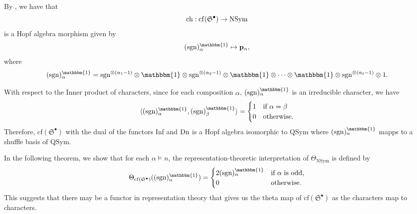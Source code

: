 \documentclass[11pt]{amsart}
\numberwithin{equation}{section}
\newcommand{\NSym}{\mathrm{NSym}}
\newcommand{\QSym}{\mathrm{QSym}}
\newcommand{\bbmone}{{\mathbbm{1}}}
\newcommand{\frakS}{{\mathfrak{S}}}
\newcommand{\cf}{{\mathrm{cf}}}
\newcommand{\sgn}{{\mathrm{sgn}}}
\begin{document}
By \cite[Lemma 4.4]{AT}, we have that 
$${\rm ch}: \cf(\frakS^\bullet) \rightarrow \NSym$$ is a Hopf algebra morphism given by 
$$(\sgn)_{\alpha}^{\bbmone} \mapsto \mathbf{p}_{\alpha},$$ where 
$$(\sgn)_\alpha^{\bbmone}=\sgn^{\otimes(\alpha_1-1)} \otimes \bbmone \otimes \sgn^{\otimes(\alpha_2-1)} \otimes \bbmone \otimes  \cdots \otimes \bbmone \otimes \sgn^{\otimes(\alpha_{\ell}-1)} \otimes 1.$$ 

With respect to the Inner product of characters, since for each composition $\alpha$, $(\sgn)_\alpha^{\bbmone}$ is an irreducible character, we have $$\langle (\sgn)_\alpha^{\bbmone}, (\sgn)_\beta^{\bbmone}  \rangle=\begin{cases}
1 & \text{if $\alpha=\beta$}\\
0 & \text{otherwise.}
\end{cases}$$ 
Therefore, $\cf(\frakS^\bullet)$ with the dual of the functors {\rm Inf} and ${\rm Dn}$ is a Hopf algebra isomorphic to $\QSym$ where $(\sgn)_\alpha^{\bbmone}$ mapps to a shuffle basis of $\QSym$. 

In the following theorem, we show that for each $\alpha\vDash n$, the representation-theoretic interpretation of $\Theta_\NSym$ is defined by 
$$\Theta_{\cf(\frakS^\bullet)}((\sgn)_\alpha^{\bbmone})=\begin{cases}
2 (\sgn)_\alpha^{\bbmone} & \text{if $\alpha$ is odd,}\\
0 & \text{otherwise.}
\end{cases}$$
This suggests that there may be a functor in representation theory that gives us the theta map of $\cf(\frakS^\bullet)$ as the characters map to characters. 
\end{document}
